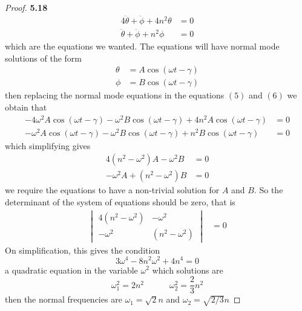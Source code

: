 \documentclass[11pt]{article}
\theoremstyle{definition}
\begin{document}
\begin{proof}{\textbf{5.18}}
\begin{align}
            4\ddot{\theta} + \ddot{\phi} + 4n^2\theta &= 0\\
            \ddot{\theta} + \ddot{\phi} + n^2\phi &= 0 
        \end{align}
        which are the equations we wanted.
\cleardoublepage
        The equations will have normal mode solutions of the form
        \begin{align*}
            \theta &= A\cos(\omega t - \gamma)\\
            \phi &= B\cos(\omega t - \gamma)
        \end{align*}
        then replacing the normal mode equations in the equations $(5)$ and
        $(6)$ we obtain that
        \begin{align*}
            -4\omega^2A\cos(\omega t - \gamma) -\omega^2B\cos(\omega t - \gamma) + 4n^2A\cos(\omega t - \gamma) &= 0 \\
            -\omega^2A\cos(\omega t - \gamma) -\omega^2B\cos(\omega t - \gamma) + n^2B\cos(\omega t - \gamma) &= 0
        \end{align*}
        which simplifying gives
        \begin{align}
            4(n^2-\omega^2)A -\omega^2B &= 0 \\
            -\omega^2A + (n^2-\omega^2)B &= 0
        \end{align}
        we require the equations to have a non-trivial solution for $A$ and $B$.
        So the determinant of the system of equations should be zero, that is
        \begin{align*} 
            \begin{vmatrix}
            4(n^2-\omega^2) & -\omega^2 \\
            -\omega^2 & (n^2-\omega^2) 
            \end{vmatrix}
            &= 0
        \end{align*}
        On simpliﬁcation, this gives the condition
        $$3\omega^4 -8n^2\omega^2 + 4n^4 = 0$$
        a quadratic equation in the variable $\omega^2$ which solutions are
        $$\omega_1^2 = 2n^2 \quad\quad\quad \omega_2^2 =\frac{2}{3}n^2$$
        then the normal frequencies are $\omega_1 = \sqrt{2}n$ and
        $\omega_2 = \sqrt{2/3}n$


\end{proof}
\end{document}
